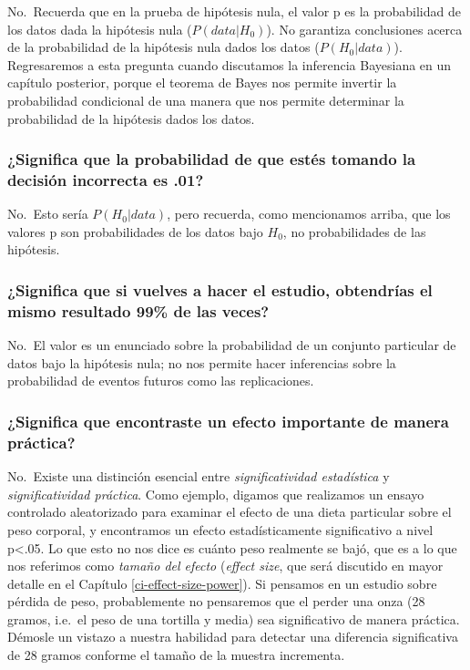 \documentclass[
  12pt,
]{book}
\begin{document}
No.~Recuerda que en la prueba de hipótesis nula, el valor p es la probabilidad de los datos dada la hipótesis nula (\(P(data|H_0)\)). No garantiza conclusiones acerca de la probabilidad de la hipótesis nula dados los datos (\(P(H_0|data)\)). Regresaremos a esta pregunta cuando discutamos la inferencia Bayesiana en un capítulo posterior, porque el teorema de Bayes nos permite invertir la probabilidad condicional de una manera que nos permite determinar la probabilidad de la hipótesis dados los datos.

\hypertarget{significa-que-la-probabilidad-de-que-estuxe9s-tomando-la-decisiuxf3n-incorrecta-es-.01}{%
\subsubsection{¿Significa que la probabilidad de que estés tomando la decisión incorrecta es .01?}\label{significa-que-la-probabilidad-de-que-estuxe9s-tomando-la-decisiuxf3n-incorrecta-es-.01}}

No.~Esto sería \(P(H_0|data)\), pero recuerda, como mencionamos arriba, que los valores p son probabilidades de los datos bajo \(H_0\), no probabilidades de las hipótesis.

\hypertarget{significa-que-si-vuelves-a-hacer-el-estudio-obtendruxedas-el-mismo-resultado-99-de-las-veces}{%
\subsubsection{¿Significa que si vuelves a hacer el estudio, obtendrías el mismo resultado 99\% de las veces?}\label{significa-que-si-vuelves-a-hacer-el-estudio-obtendruxedas-el-mismo-resultado-99-de-las-veces}}

No.~El valor es un enunciado sobre la probabilidad de un conjunto particular de datos bajo la hipótesis nula; no nos permite hacer inferencias sobre la probabilidad de eventos futuros como las replicaciones.

\hypertarget{significa-que-encontraste-un-efecto-importante-de-manera-pruxe1ctica}{%
\subsubsection{¿Significa que encontraste un efecto importante de manera práctica?}\label{significa-que-encontraste-un-efecto-importante-de-manera-pruxe1ctica}}

No.~Existe una distinción esencial entre \emph{significatividad estadística} y \emph{significatividad práctica}. Como ejemplo, digamos que realizamos un ensayo controlado aleatorizado para examinar el efecto de una dieta particular sobre el peso corporal, y encontramos un efecto estadísticamente significativo a nivel p\textless.05. Lo que esto no nos dice es cuánto peso realmente se bajó, que es a lo que nos referimos como \emph{tamaño del efecto} (\emph{effect size}, que será discutido en mayor detalle en el Capítulo \ref{ci-effect-size-power}). Si pensamos en un estudio sobre pérdida de peso, probablemente no pensaremos que el perder una onza (28 gramos, i.e.~el peso de una tortilla y media) sea significativo de manera práctica. Démosle un vistazo a nuestra habilidad para detectar una diferencia significativa de 28 gramos conforme el tamaño de la muestra incrementa.
\end{document}
